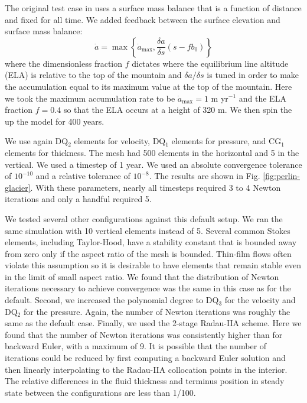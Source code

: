 \documentclass[gmd, manuscript]{copernicus}
\begin{document}
The original test case in \citet{ahlkrona2026fully} uses a surface mass balance that is a function of distance and fixed for all time.
We added feedback between the surface elevation and surface mass balance:
\begin{equation}
    \dot a = \max\left\{\dot a_{\text{max}}, \frac{\delta a}{\delta s}(s - fb_0)\right\}
\end{equation}
where the dimensionless fraction $f$ dictates where the equilibrium line altitude (ELA) is relative to the top of the mountain and $\delta a/\delta s$ is tuned in order to make the accumulation equal to its maximum value at the top of the mountain.
Here we took the maximum accumulation rate to be $\dot a_{\text{max}} = 1$ m yr${}^{-1}$ and the ELA fraction $f = 0.4$ so that the ELA occurs at a height of 320 m.
We then spin the up the model for 400 years.

We use again DQ${}_2$ elements for velocity, DQ${}_1$ elements for pressure, and CG${}_1$ elements for thickness.
The mesh had 500 elements in the horizontal and 5 in the vertical.
We used a timestep of 1 year.
We used an absolute convergence tolerance of $10^{-10}$ and a relative tolerance of $10^{-8}$.
The results are shown in Fig. \ref{fig:perlin-glacier}.
With these parameters, nearly all timesteps required 3 to 4 Newton iterations and only a handful required 5.

We tested several other configurations against this default setup.
We ran the same simulation with 10 vertical elements instead of 5.
Several common Stokes elements, including Taylor-Hood, have a stability constant that is bounded away from zero only if the aspect ratio of the mesh is bounded.
Thin-film flows often violate this assumption so it is desirable to have elements that remain stable even in the limit of small aspect ratio.
We found that the distribution of Newton iterations necessary to achieve convergence was the same in this case as for the default.
Second, we increased the polynomial degree to DQ${}_3$ for the velocity and DQ${}_2$ for the pressure.
Again, the number of Newton iterations was roughly the same as the default case.
Finally, we used the 2-stage Radau-IIA scheme.
Here we found that the number of Newton iterations was consistently higher than for backward Euler, with a maximum of 9.
It is possible that the number of iterations could be reduced by first computing a backward Euler solution and then linearly interpolating to the Radau-IIA collocation points in the interior.
The relative differences in the fluid thickness and terminus position in steady state between the configurations are less than 1/100.
\end{document}
